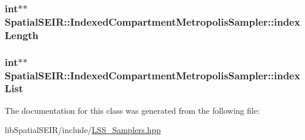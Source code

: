 \hypertarget{classSpatialSEIR_1_1IndexedCompartmentMetropolisSampler_adb184082c1e6f3a4065edee600f69c1b}{
\subsubsection[{index\-Length}]{\setlength{\rightskip}{0pt plus 5cm}int$\ast$$\ast$ Spatial\-S\-E\-I\-R\-::\-Indexed\-Compartment\-Metropolis\-Sampler\-::index\-Length}}\label{classSpatialSEIR_1_1IndexedCompartmentMetropolisSampler_adb184082c1e6f3a4065edee600f69c1b}
\hypertarget{classSpatialSEIR_1_1IndexedCompartmentMetropolisSampler_a69b2f84b4fe8bbb44831a106b3d55bfe}{
\subsubsection[{index\-List}]{\setlength{\rightskip}{0pt plus 5cm}int$\ast$$\ast$ Spatial\-S\-E\-I\-R\-::\-Indexed\-Compartment\-Metropolis\-Sampler\-::index\-List}}\label{classSpatialSEIR_1_1IndexedCompartmentMetropolisSampler_a69b2f84b4fe8bbb44831a106b3d55bfe}


The documentation for this class was generated from the following file\-:\begin{DoxyCompactItemize}
\item 
lib\-Spatial\-S\-E\-I\-R/include/\hyperlink{LSS__Samplers_8hpp}{L\-S\-S\-\_\-\-Samplers.\-hpp}\end{DoxyCompactItemize}
